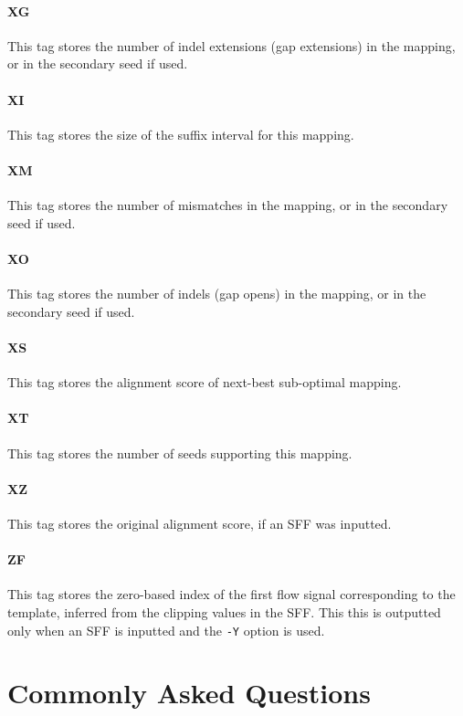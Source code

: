 \documentclass[a4paper,12pt]{book}
\newcommand{\TT}[1]{{\tt #1}} %
\begin{document}
\subsubsection{XG}
This tag stores the number of indel extensions (gap extensions) in the mapping, or in the secondary seed if used.

\subsubsection{XI}
This tag stores the size of the suffix interval for this mapping.

\subsubsection{XM}
This tag stores the number of mismatches in the mapping, or in the secondary seed if used.

\subsubsection{XO}
This tag stores the number of indels (gap opens) in the mapping, or in the secondary seed if used.

\subsubsection{XS}
This tag stores the alignment score of next-best sub-optimal mapping.

\subsubsection{XT}
This tag stores the number of seeds supporting this mapping.
\subsubsection{XZ}
This tag stores the original alignment score, if an SFF was inputted.


\subsubsection{ZF}
This tag stores the zero-based index of the first flow signal corresponding to the template, inferred from the clipping values in the SFF.
This this is outputted only when an SFF is inputted and the \TT{-Y} option is used.
\chapter{Commonly Asked Questions}
\label{chap:faq}
\end{document}
